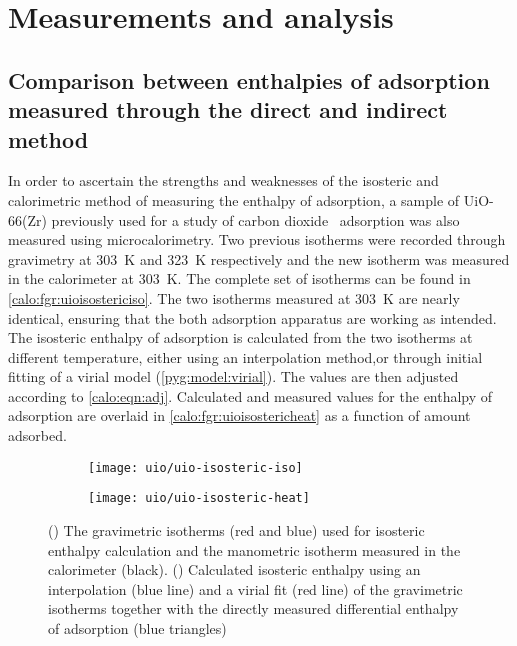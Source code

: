 
\section{Measurements and analysis}

\subsection{Comparison between enthalpies of adsorption measured
	through the direct and indirect method}

In order to ascertain the strengths and weaknesses of the isosteric 
and calorimetric method of measuring the enthalpy of adsorption, 
a sample of UiO-66(Zr) previously used for a study of 
carbon dioxide~\cite{wiersumEvaluationUiO66GasBased2011} adsorption
was also measured using microcalorimetry.
Two previous isotherms were recorded through gravimetry at \SI{303}{\kelvin} and
\SI{323}{\kelvin} respectively and the new isotherm was measured in the 
calorimeter at \SI{303}{\kelvin}. The complete set of isotherms can
be found in \autoref{calo:fgr:uioisostericiso}.
The two isotherms measured at \SI{303}{\kelvin} are nearly identical, 
ensuring that the both adsorption apparatus are working as intended.
The isosteric enthalpy of adsorption is calculated from the two isotherms
at different temperature, either using an interpolation method,or through
initial fitting of a virial model (\autoref{pyg:model:virial}).
The values are then adjusted according to \autoref{calo:eqn:adj}.
Calculated and measured values for the enthalpy of adsorption are overlaid
in \autoref{calo:fgr:uioisostericheat} as a function of amount adsorbed.

\begin{figure}[htb]
	\centering

	\begin{subfigure}[b]{.5\textwidth}
		\centering
		\texttt{[image: uio/uio-isosteric-iso]}
		\caption{}%
		\label{calo:fgr:uioisostericiso}
	\end{subfigure}%
	\begin{subfigure}[b]{.5\textwidth}
		\centering
		\texttt{[image: uio/uio-isosteric-heat]}
		\caption{}%
		\label{calo:fgr:uioisostericheat}
	\end{subfigure}
	\caption{(\protect{})
		The gravimetric isotherms (red and blue) used for isosteric enthalpy
		calculation and the manometric isotherm measured in the calorimeter (black).
		(\protect{}) Calculated
		isosteric enthalpy using an interpolation (blue line) and a
		virial fit (red line) of the gravimetric isotherms together with
		the directly measured differential enthalpy of adsorption (blue triangles)}%
	\label{calo:fgr:uioisosteric}

\end{figure}

